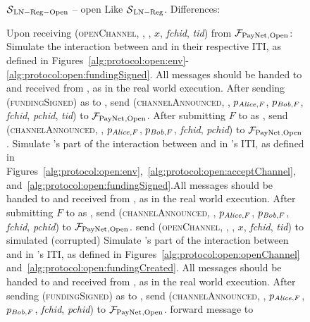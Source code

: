 \begin{figure}[!htbp]
  \begin{simulatorbox}{$\mathcal{S}{}_{\mathrm{LN - Reg - Open}}$ -- open}
    Like $\mathcal{S}{}_{\mathrm{LN - Reg}}$. Differences:
    \begin{algorithmic}[1]
      \State Upon receiving (\textsc{openChannel}, \alice, \bob, $x$,
      \textit{fchid}, \textit{tid}) from $\mathcal{F}_{\mathrm{PayNet}}{}_{\mathrm{, Open}}$:
      \Indent
          \State Simulate the interaction between \alice{} and \bob{} in their
          respective ITI, as defined in
          Figures~\ref{alg:protocol:open:env}-\ref{alg:protocol:open:fundingSigned}.
          All messages should be handed to and received from \adversary, as in
          the real world execution.
          \State After sending (\textsc{fundingSigned}) as \bob{} to \alice,
          send (\textsc{channelAnnounced}, \bob, $p_{\mathit{Alice}, F}$, $p_{\mathit{Bob}, F}$,
          \textit{fchid}, \textit{pchid}, \textit{tid}) to
          $\mathcal{F}_{\mathrm{PayNet}}{}_{\mathrm{, Open}}$.
          \label{alg:sim:open:announced:bob:bothhonest}
          \State After submitting $F$ to \ledger{} as \alice, send
          (\textsc{channelAnnounced}, \alice, $p_{\mathit{Alice}, F}$, $p_{\mathit{Bob}, F}$,
          \textit{fchid}, \textit{pchid}) to $\mathcal{F}_{\mathrm{PayNet}}{}_{\mathrm{, Open}}$.
          \label{alg:sim:open:announced:alice:bothhonest}
          \State Simulate \alice's part of the interaction between \alice{}
          and \bob{} in \alice's ITI, as defined in
          Figures~\ref{alg:protocol:open:env},~\ref{alg:protocol:open:acceptChannel},
          and~\ref{alg:protocol:open:fundingSigned}.All messages should be
          handed to and received from \adversary, as in the real world
          execution.
          \State After submitting $F$ to \ledger{} as \alice, send
          (\textsc{channelAnnounced}, \alice, $p_{\mathit{Alice}, F}$, $p_{\mathit{Bob}, F}$,
          \textit{fchid}, \textit{pchid}) to $\mathcal{F}_{\mathrm{PayNet}}{}_{\mathrm{, Open}}$.
          \label{alg:sim:open:announced:alice:alicehonest}
          \State send (\textsc{openChannel}, \alice, \bob, $x$,
          \textit{fchid}, \textit{tid}) to simulated (corrupted) \alice
          \State Simulate \bob's part of the interaction between \alice{}
          and \bob{} in \bob's ITI, as defined in
          Figures~\ref{alg:protocol:open:openChannel}
          and~\ref{alg:protocol:open:fundingCreated}.
          All messages should be handed to and received from \adversary, as in
          the real world execution.
          \State After sending (\textsc{fundingSigned}) as \bob{} to \alice,
          send (\textsc{channelAnnounced}, \bob, $p_{\mathit{Alice}, F}$, $p_{\mathit{Bob}, F}$,
          \textit{fchid}, \textit{pchid}) to $\mathcal{F}_{\mathrm{PayNet}}{}_{\mathrm{, Open}}$.
          \label{alg:sim:open:announced:bob:bobhonest}
          \State forward message to \adversary{} 
        \EndIf
      \EndIndent
      \Statex


\end{algorithmic}
\end{simulatorbox}
\end{figure}
